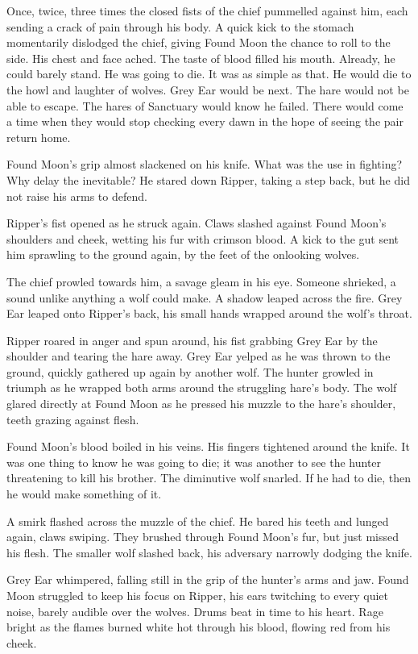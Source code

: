 Once, twice, three times the closed fists of the chief pummelled against him, each sending a crack of pain through his body. A quick kick to the stomach momentarily dislodged the chief, giving Found Moon the chance to roll to the side. His chest and face ached. The taste of blood filled his mouth. Already, he could barely stand. He was going to die. It was as simple as that. He would die to the howl and laughter of wolves. Grey Ear would be next. The hare would not be able to escape. The hares of Sanctuary would know he failed. There would come a time when they would stop checking every dawn in the hope of seeing the pair return home.

Found Moon's grip almost slackened on his knife. What was the use in fighting? Why delay the inevitable? He stared down Ripper, taking a step back, but he did not raise his arms to defend.

Ripper's fist opened as he struck again. Claws slashed against Found Moon's shoulders and cheek, wetting his fur with crimson blood. A kick to the gut sent him sprawling to the ground again, by the feet of the onlooking wolves.

The chief prowled towards him, a savage gleam in his eye. Someone shrieked, a sound unlike anything a wolf could make. A shadow leaped across the fire. Grey Ear leaped onto Ripper's back, his small hands wrapped around the wolf's throat.

Ripper roared in anger and spun around, his fist grabbing Grey Ear by the shoulder and tearing the hare away. Grey Ear yelped as he was thrown to the ground, quickly gathered up again by another wolf. The hunter growled in triumph as he wrapped both arms around the struggling hare's body. The wolf glared directly at Found Moon as he pressed his muzzle to the hare's shoulder, teeth grazing against flesh.

Found Moon's blood boiled in his veins. His fingers tightened around the knife. It was one thing to know he was going to die; it was another to see the hunter threatening to kill his brother. The diminutive wolf snarled. If he had to die, then he would make something of it.

A smirk flashed across the muzzle of the chief. He bared his teeth and lunged again, claws swiping. They brushed through Found Moon's fur, but just missed his flesh. The smaller wolf slashed back, his adversary narrowly dodging the knife.

Grey Ear whimpered, falling still in the grip of the hunter's arms and jaw. Found Moon struggled to keep his focus on Ripper, his ears twitching to every quiet noise, barely audible over the wolves. Drums beat in time to his heart. Rage bright as the flames burned white hot through his blood, flowing red from his cheek.

